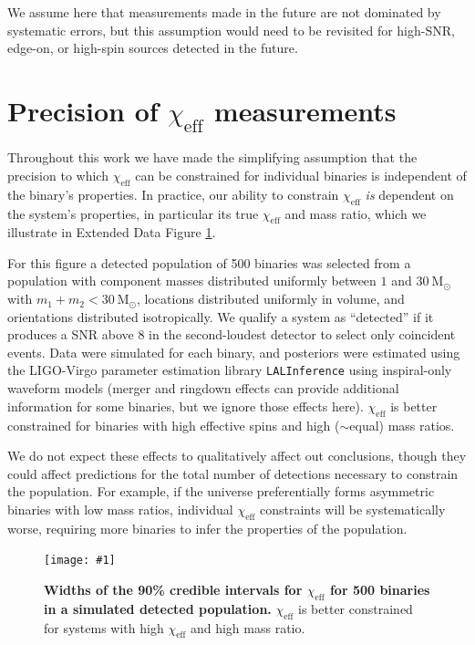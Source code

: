 \documentclass{nature-arxiv}
\newcommand{\chieff}{\chi_\mathrm{eff}}
\newcommand{\plotone}[1]{\texttt{[image: \#1]}}
\begin{document}
\begin{methods}
We assume here that measurements made in the future are not dominated
by systematic errors, but this assumption would need to be revisited
for high-SNR, edge-on, or high-spin sources detected in the future.

\section{Precision of $\chieff$ measurements}
\label{sec:chi-eff-precision}
Throughout this work we have made the simplifying assumption that the
precision to which $\chieff$ can be constrained for individual binaries
is independent of the binary's properties.  In practice, our ability to
constrain $\chieff$ \emph{is} dependent on the system's properties, in
particular its true $\chieff$ and mass ratio, which we illustrate in
Extended Data Figure \ref{fig:chi-eff-constraints}.

For this figure a detected population of 500 binaries was selected
from a population with component masses distributed uniformly between
$1$ and $30~\mathrm{M}_\odot$ with $m_1 + m_2 < 30~\mathrm{M}_\odot$,
locations distributed uniformly in volume, and orientations
distributed isotropically.  We qualify a system as ``detected'' if it
produces a SNR above $8$ in the second-loudest detector to select only
coincident events.  Data were simulated for each binary, and
posteriors were estimated using the LIGO-Virgo parameter estimation
library \texttt{LALInference}\cite{2015PhRvD..91d2003V} using
inspiral-only waveform models (merger and ringdown effects can provide
additional information for some binaries, but we ignore those effects
here).  $\chieff$ is better constrained for binaries with high
effective spins and high ($\sim$equal) mass ratios.

We do not expect these effects to qualitatively affect
out conclusions, though they could affect predictions for the total
number of detections necessary to constrain the population.  For
example, if the universe preferentially forms asymmetric binaries with
low mass ratios, individual $\chieff$ constraints will be systematically
worse, requiring more binaries to infer the properties
of the population.

\begin{figure}
  \plotone{../plots/chi-eff-90cl}
  \caption{\textbf{Widths of the 90\% credible intervals for $\chieff$
      for 500 binaries in a simulated detected population.} $\chieff$
    is better constrained for systems with high $\chieff$ and high mass
    ratio.}
  \label{fig:chi-eff-constraints}
\end{figure}

\end{methods}
\end{document}
